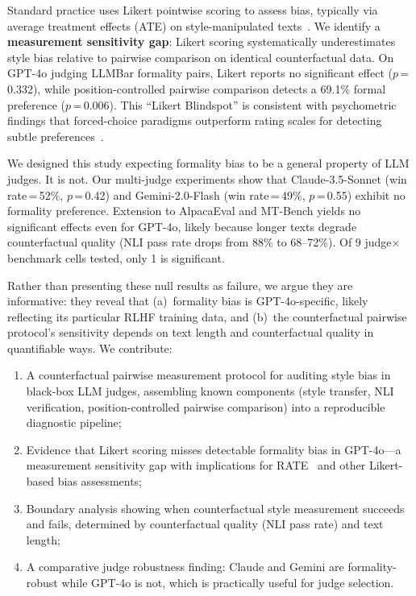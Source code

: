 \documentclass[11pt,a4paper]{article}
\begin{document}
Standard practice uses Likert pointwise scoring to assess bias, typically via average treatment effects (ATE) on style-manipulated texts~\cite{ratebias2025}.
We identify a \textbf{measurement sensitivity gap}: Likert scoring systematically underestimates style bias relative to pairwise comparison on identical counterfactual data.
On GPT-4o judging LLMBar formality pairs, Likert reports no significant effect ($p$\,=\,0.332), while position-controlled pairwise comparison detects a 69.1\% formal preference ($p$\,=\,0.006).
This ``Likert Blindspot'' is consistent with psychometric findings that forced-choice paradigms outperform rating scales for detecting subtle preferences~\cite{thurstone1927,kiritchenko2017,novikova2018}.

We designed this study expecting formality bias to be a general property of LLM judges.
It is not.
Our multi-judge experiments show that Claude-3.5-Sonnet (win rate\,=\,52\%, $p$\,=\,0.42) and Gemini-2.0-Flash (win rate\,=\,49\%, $p$\,=\,0.55) exhibit no formality preference.
Extension to AlpacaEval and MT-Bench yields no significant effects even for GPT-4o, likely because longer texts degrade counterfactual quality (NLI pass rate drops from 88\% to 68--72\%).
Of 9 judge$\times$benchmark cells tested, only 1 is significant.

Rather than presenting these null results as failure, we argue they are informative: they reveal that (a)~formality bias is GPT-4o-specific, likely reflecting its particular RLHF training data, and (b)~the counterfactual pairwise protocol's sensitivity depends on text length and counterfactual quality in quantifiable ways.
We contribute:
\begin{enumerate}
    \item A counterfactual pairwise measurement protocol for auditing style bias in black-box LLM judges, assembling known components (style transfer, NLI verification, position-controlled pairwise comparison) into a reproducible diagnostic pipeline;
    \item Evidence that Likert scoring misses detectable formality bias in GPT-4o---a measurement sensitivity gap with implications for RATE~\cite{ratebias2025} and other Likert-based bias assessments;
    \item Boundary analysis showing when counterfactual style measurement succeeds and fails, determined by counterfactual quality (NLI pass rate) and text length;
    \item A comparative judge robustness finding: Claude and Gemini are formality-robust while GPT-4o is not, which is practically useful for judge selection.
\end{enumerate}
\end{document}
